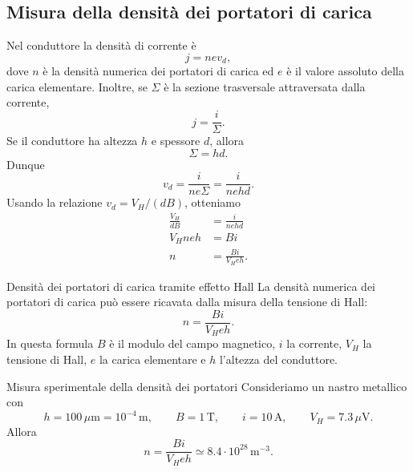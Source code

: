 \documentclass[a4paper]{article}
\begin{document}
\subsection{Misura della densità dei portatori di carica}

Nel conduttore la densità di corrente è
\[
    j = nev_d,
\]
dove \(n\) è la densità numerica dei portatori di carica ed \(e\) è il valore assoluto della carica elementare. Inoltre, se \(\Sigma\) è la sezione trasversale attraversata dalla corrente,
\[
    j = \frac{i}{\Sigma}.
\]
Se il conduttore ha altezza \(h\) e spessore \(d\), allora
\[
    \Sigma = hd.
\]
Dunque
\[
    v_d = \frac{i}{ne\Sigma}=\frac{i}{nehd}.
\]
Usando la relazione \(v_d=V_H/(dB)\), otteniamo
\begin{align*}
    \frac{V_H}{dB}
    &= \frac{i}{nehd} \\
    V_Hne h &= Bi \\
    n &= \frac{Bi}{V_Heh}.
\end{align*}

\begin{snippetproposition}{Densità dei portatori di carica tramite effetto Hall}
    La densità numerica dei portatori di carica può essere ricavata dalla misura della tensione di Hall:
    \[
        n = \frac{Bi}{V_Heh}.
    \]
    In questa formula \(B\) è il modulo del campo magnetico, \(i\) la corrente, \(V_H\) la tensione di Hall, \(e\) la carica elementare e \(h\) l'altezza del conduttore.
\end{snippetproposition}

\begin{center}
\end{center}

\begin{snippetexample}{Misura sperimentale della densità dei portatori}
    Consideriamo un nastro metallico con
    \[
        h=100\,\mu\mathrm{m}=10^{-4}\,\mathrm{m},
        \qquad
        B=1\,\mathrm{T},
        \qquad
        i=10\,\mathrm{A},
        \qquad
        V_H=7.3\,\mu\mathrm{V}.
    \]
    Allora
    \[
        n = \frac{Bi}{V_Heh}
        \simeq 8.4\cdot 10^{28}\,\mathrm{m}^{-3}.
    \]
\end{snippetexample}
\end{document}
